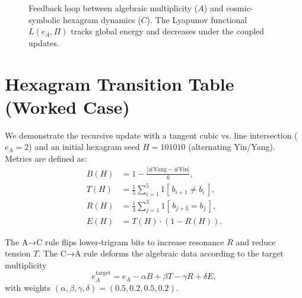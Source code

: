 \documentclass[12pt]{article}
\begin{document}
\begin{figure}[h]
\centering
{}
\caption{Feedback loop between algebraic multiplicity ($A$) and cosmic-symbolic hexagram dynamics ($C$). The Lyapunov functional $L(e_A,\Pi)$ tracks global energy and decreases under the coupled updates.}
\end{figure}

\section{Hexagram Transition Table (Worked Case)}

We demonstrate the recursive update with a tangent cubic vs. line intersection ($e_A=2$) and an initial hexagram seed $H=101010$ (alternating Yin/Yang). Metrics are defined as:
\[
\begin{aligned}
B(H)&=1-\tfrac{|\#\text{Yang}-\#\text{Yin}|}{6},\\
T(H)&=\tfrac{1}{5}\sum_{i=1}^5 1[\,b_{i+1}\neq b_i\,],\\
R(H)&=\tfrac{1}{3}\sum_{j=1}^3 1[\,b_{j+3}=b_j\,],\\
E(H)&=T(H)\cdot (1-R(H)).
\end{aligned}
\]

The A→C rule flips lower-trigram bits to increase resonance $R$ and reduce tension $T$. The C→A rule deforms the algebraic data according to the target multiplicity
\[
e_A^{\mathrm{target}} = e_A - \alpha B + \beta T - \gamma R + \delta E,
\]
with weights $(\alpha,\beta,\gamma,\delta)=(0.5,0.2,0.5,0.2)$.
\end{document}
